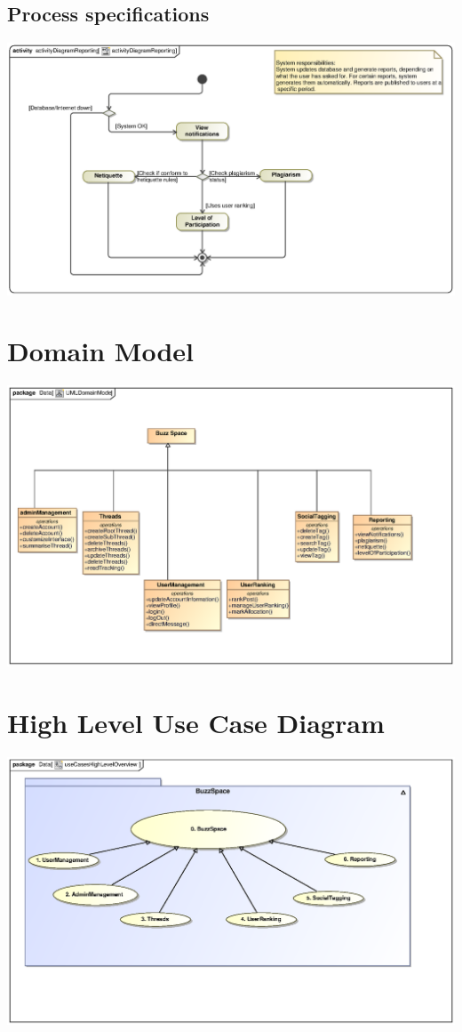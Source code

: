 \documentclass[hidelinks, 12pt, oneside]{article}
\begin{document}
\subsection{Process specifications}
\includegraphics[scale=.9]{Hlavutelo/graphics/activityDiagramReporting.eps}\\

\section{Domain Model} 
\includegraphics[scale=.9]{Kgomotso/graphics/UMLDomainModel.eps}\\

\section{ High Level Use Case Diagram} 
\includegraphics[scale=.9]{Shaun/graphics/useCasesHighLevelOverview.eps}\\
\end{document}
